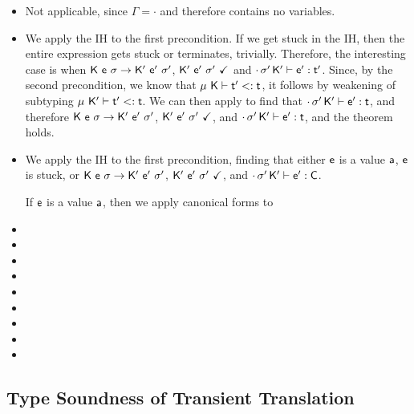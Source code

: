 \documentclass[a4paper,USenglish]{tex/lipics-v2016}
\begin{document}
\begin{itemize}
  \item {}
        Not applicable, since $\Gamma = \cdot$ and therefore contains no variables.
  \item {}

        We apply the IH to the first precondition. If we get stuck in the IH, then the entire
        expression gets stuck or terminates, trivially. Therefore, the interesting case is when
        ${{\sf{K}}}~{{\sf{e}}}~{\sigma} \rightarrow {{\ensuremath{{\sf{K'}}}}}~{{{{\sf{e'}}}}}~{{{\sigma'}}}$, ${{\sf{K'}}}~{{{\sf{e'}}}}~{{\sigma'}}~\checkmark$ and $\EnvType\cdot\sp\Kp\ep\tp$. Since, by the
        second precondition, we know that $\StrSub \M\K \tp \t$, it follows by weakening of subtyping $\StrSub\M\Kp\tp\t$.
        We can then apply  to find that $\EnvType\cdot\sp\Kp\ep\t$, and therefore ${{\sf{K}}}~{{\sf{e}}}~{\sigma} \rightarrow {{\ensuremath{{\sf{K'}}}}}~{{{{\sf{e'}}}}}~{{{\sigma'}}}$, ${{\sf{K'}}}~{{{\sf{e'}}}}~{{\sigma'}}~\checkmark$, and $\EnvType\cdot\sp\Kp\ep\t$, and the theorem holds.
  \item {}

        We apply the IH to the first precondition, finding that either ${\sf{e}}$ is a value ${\sf{a}}$, ${\sf{e}}$ is stuck, or ${{\sf{K}}}~{{\sf{e}}}~{\sigma} \rightarrow {{\ensuremath{{\sf{K'}}}}}~{{{{\sf{e'}}}}}~{{{\sigma'}}}$, ${{\sf{K'}}}~{{{\sf{e'}}}}~{{\sigma'}}~\checkmark$, and $\cdot\,{{\sigma'}}\,{{\sf{K'}}}\vdash {{\ensuremath{{\sf{e'}}}}} : {\sf{C}}$. 

        If ${\sf{e}}$ is a value ${\sf{a}}$, then we apply canonical forms to 

  \item {}
  \item {}
  \item {}
  
  \item {}
  
  \item {}
  
  \item {}
  
  \item {}
  
  \item {}
  
  \item {}
\end{itemize}

\subsection{Type Soundness of Transient Translation}
\end{document}

